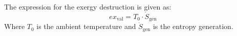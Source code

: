 The expression for the exergy destruction is given as:  
\[
ex_{\text{val}} = T_0 \cdot \dot{S}_{\text{gen}}
\]  
Where \( T_0 \) is the ambient temperature and \( \dot{S}_{\text{gen}} \) is the entropy generation.